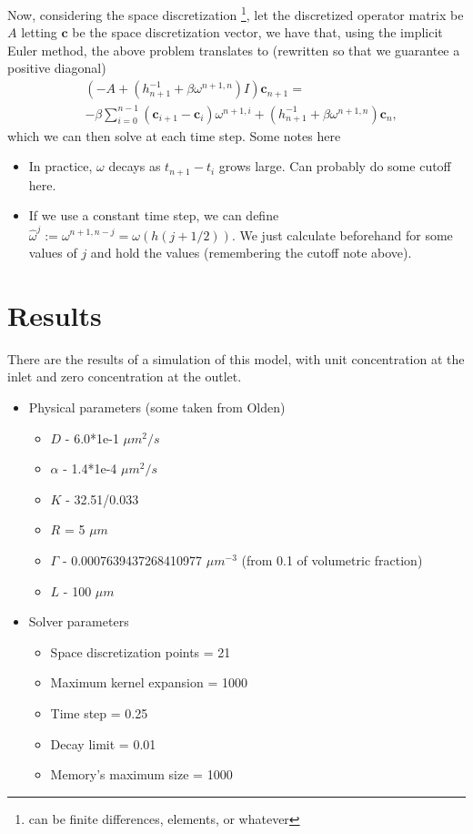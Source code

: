 \documentclass[]{article}
\begin{document}
Now, considering the space discretization \footnote{can be finite differences, elements, or whatever}, let the discretized operator matrix be $A$ letting $\mathbf{c}$ be the space discretization vector, we have that, using the implicit Euler method, the above problem translates to (rewritten so that we guarantee a positive diagonal)
\begin{equation}
 \begin{split}
 & \left(-A + (h_{n+1}^{-1} + \beta \omega^{n+1, n}) I \right)\mathbf{c}_{n+1} = \\
 & -\beta \sum_{i=0}^{n-1} (\mathbf{c}_{i+1} - \mathbf{c}_i) \omega^{n+1, i} + \left(h_{n+1}^{-1} + \beta \omega^{n+1, n} \right) \mathbf{c}_{n},
 \end{split}
\end{equation}
which we can then solve at each time step. Some notes here
\begin{itemize}
	\item In practice, $\omega$ decays as $t_{n+1} - t_i$ grows large. Can probably do some cutoff here.
	\item If we use a constant time step, we can define $\hat{\omega}^j := \omega^{n+1, n-j} = \omega(h(j + 1/2))$. We just calculate beforehand for some values of $j$ and hold the values (remembering the cutoff note above).
\end{itemize}

\section{Results}
There are the results of a simulation of this model, with unit concentration at the inlet and zero concentration at the outlet.
\begin{itemize}
	\item Physical parameters (some taken from Olden)
	\begin{itemize}
		\item $D$ - 6.0*1e-1 $\mu m^2/s$
		\item $\alpha$ - 1.4*1e-4 $\mu m^2/s$
		\item $K$ - 32.51/0.033
		\item $R$ = 5 $\mu m$
		\item $\Gamma$ - 0.0007639437268410977 $\mu m^{-3}$ (from 0.1 of volumetric fraction)
		\item $L$ - 100 $\mu m$
	\end{itemize}
	\item Solver parameters
	\begin{itemize}
		\item Space discretization points = 21
		\item Maximum kernel expansion = 1000
		\item Time step = 0.25
		\item Decay limit = 0.01
		\item Memory's maximum size = 1000
	\end{itemize}
\end{itemize}
\end{document}

